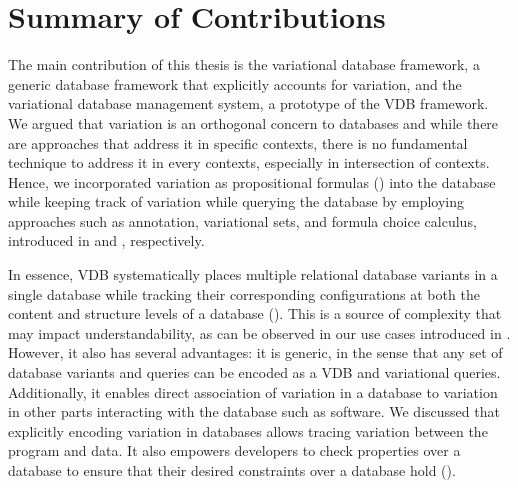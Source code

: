 \section{Summary of Contributions}
\label{sec:sum-contr}

The main contribution of this thesis is the variational database framework, 
a generic database framework that explicitly accounts for variation, 
and the variational database management system, a prototype of the VDB framework. 
%
We argued that variation is an orthogonal concern to databases
and while there are approaches that address it in specific contexts,
there is no fundamental technique to address it in every contexts, especially in 
intersection of contexts. Hence, we incorporated variation as 
propositional formulas () 
into the database while keeping
track of variation while querying the database by employing approaches such as annotation,
variational sets, and formula choice calculus, introduced in  and
, respectively.
%


In essence, VDB systematically places multiple relational database variants 
in a single database while tracking their corresponding configurations at both
the content and structure levels of a database (). 
%
This is a source of complexity that may impact understandability, as can be
observed in our use cases introduced in . 
However, it also has several advantages: it
is generic, in the sense that any set of database variants and queries can be
encoded as a VDB and variational queries. Additionally, it enables direct association of variation
in a database to variation in other parts interacting with the database such as software.
%
 We discussed that explicitly encoding variation in databases
 allows  tracing variation between the program and data. It also empowers
 developers to check properties over a database to ensure that
their desired constraints over a database hold ().


